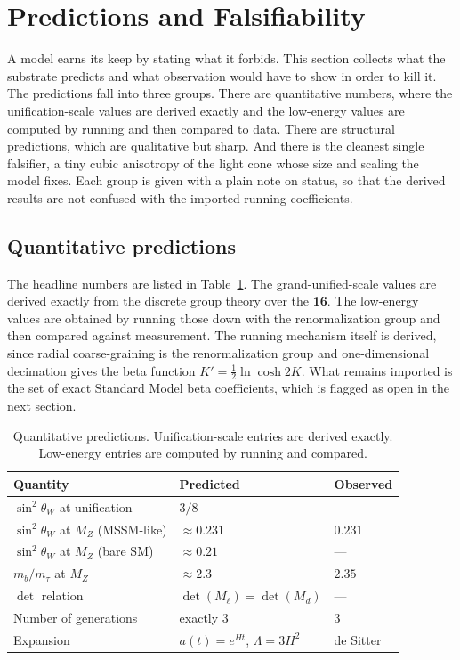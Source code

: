 \section{Predictions and Falsifiability}

A model earns its keep by stating what it forbids. This section collects what the substrate predicts and what observation would have to show in order to kill it. The predictions fall into three groups. There are quantitative numbers, where the unification-scale values are derived exactly and the low-energy values are computed by running and then compared to data. There are structural predictions, which are qualitative but sharp. And there is the cleanest single falsifier, a tiny cubic anisotropy of the light cone whose size and scaling the model fixes. Each group is given with a plain note on status, so that the derived results are not confused with the imported running coefficients.

\subsection{Quantitative predictions}

The headline numbers are listed in Table~\ref{tab:quant-predictions}. The grand-unified-scale values are derived exactly from the discrete group theory over the $\mathbf{16}$. The low-energy values are obtained by running those down with the renormalization group and then compared against measurement. The running mechanism itself is derived, since radial coarse-graining is the renormalization group and one-dimensional decimation gives the beta function $K' = \tfrac{1}{2}\ln\cosh 2K$. What remains imported is the set of exact Standard Model beta coefficients, which is flagged as open in the next section.

\begin{table}[h]
\centering
\begin{tabular}{@{}lll@{}}
\toprule
Quantity & Predicted & Observed \\
\midrule
$\sin^2\theta_W$ at unification & $3/8$ & --- \\
$\sin^2\theta_W$ at $M_Z$ (MSSM-like) & $\approx 0.231$ & $0.231$ \\
$\sin^2\theta_W$ at $M_Z$ (bare SM) & $\approx 0.21$ & --- \\
$m_b/m_\tau$ at $M_Z$ & $\approx 2.3$ & $2.35$ \\
$\det$ relation & $\det(M_{\ell}) = \det(M_d)$ & --- \\
Number of generations & exactly $3$ & $3$ \\
Expansion & $a(t) = e^{Ht}$, $\Lambda = 3H^2$ & de Sitter \\
\bottomrule
\end{tabular}
\caption{Quantitative predictions. Unification-scale entries are derived exactly. Low-energy entries are computed by running and compared.}
\label{tab:quant-predictions}
\end{table}

